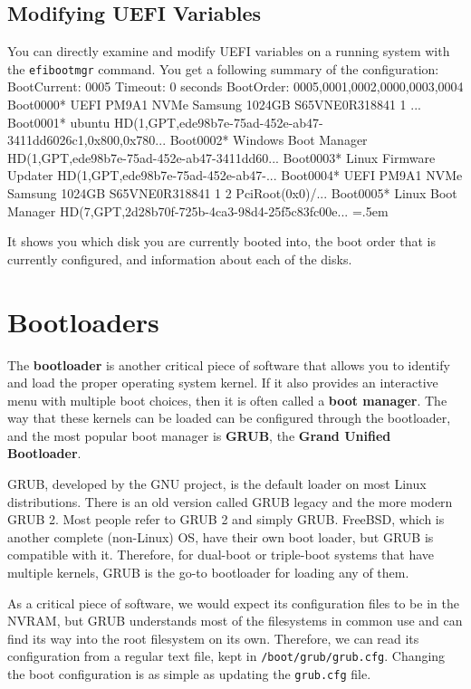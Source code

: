 \documentclass{article}
\theoremstyle{definition}
\newenvironment{cverbatim}
    {\SaveVerbatim{cverb}}
    {\endSaveVerbatim
    \flushleft\fboxrule=0pt\fboxsep=.5em
    \colorbox{cverbbg}{%
      \makebox[\dimexpr\linewidth-2\fboxsep][l]{\BUseVerbatim{cverb}}%
    }
    \endflushleft
  }
\begin{document}
  \subsection{Modifying UEFI Variables}

    You can directly examine and modify UEFI variables on a running system with the \texttt{efibootmgr} command. You get a following summary of the configuration: 
    \begin{cverbatim}
      BootCurrent: 0005
      Timeout: 0 seconds
      BootOrder: 0005,0001,0002,0000,0003,0004
      Boot0000* UEFI PM9A1 NVMe Samsung 1024GB S65VNE0R318841 1	...
      Boot0001* ubuntu	HD(1,GPT,ede98b7e-75ad-452e-ab47-3411dd6026c1,0x800,0x780...
      Boot0002* Windows Boot Manager	HD(1,GPT,ede98b7e-75ad-452e-ab47-3411dd60...
      Boot0003* Linux Firmware Updater	HD(1,GPT,ede98b7e-75ad-452e-ab47-...
      Boot0004* UEFI PM9A1 NVMe Samsung 1024GB S65VNE0R318841 1 2	PciRoot(0x0)/...
      Boot0005* Linux Boot Manager	HD(7,GPT,2d28b70f-725b-4ca3-98d4-25f5c83fc00e...
    \end{cverbatim}

  It shows you which disk you are currently booted into, the boot order that is currently configured, and information about each of the disks. 

\section{Bootloaders} 

    The \textbf{bootloader} is another critical piece of software that allows you to identify and load the proper operating system kernel. If it also provides an interactive menu with multiple boot choices, then it is often called a \textbf{boot manager}. The way that these kernels can be loaded can be configured through the bootloader, and the most popular boot manager is \textbf{GRUB}, the \textbf{Grand Unified Bootloader}. 

    GRUB, developed by the GNU project, is the default loader on most Linux distributions. There is an old version called GRUB legacy and the more modern GRUB 2. Most people refer to GRUB 2 and simply GRUB. FreeBSD, which is another complete (non-Linux) OS, have their own boot loader, but GRUB is compatible with it. Therefore, for dual-boot or triple-boot systems that have multiple kernels, GRUB is the go-to bootloader for loading any of them. 

    As a critical piece of software, we would expect its configuration files to be in the NVRAM, but GRUB understands most of the filesystems in common use and can find its way into the root filesystem on its own. Therefore, we can read its configuration from a regular text file, kept in \texttt{/boot/grub/grub.cfg}. Changing the boot configuration is as simple as updating the \texttt{grub.cfg} file. 
\end{document}
